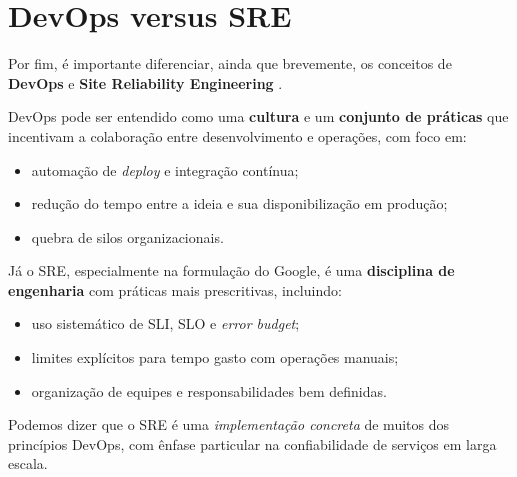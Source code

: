 \documentclass[12pt,a4paper,twoside]{report}
\begin{document}
\section{DevOps versus SRE}

Por fim, é importante diferenciar, ainda que brevemente, os conceitos de
\textbf{DevOps} \cite{kim2018devops, humble2010} e \textbf{Site Reliability Engineering} \cite{beyer2016sre}.

DevOps pode ser entendido como uma \textbf{cultura} e um \textbf{conjunto de
práticas} que incentivam a colaboração entre desenvolvimento e operações, com
foco em:
\begin{itemize}[nosep]
    \item automação de \emph{deploy} e integração contínua;
    \item redução do tempo entre a ideia e sua disponibilização em produção;
    \item quebra de silos organizacionais.
\end{itemize}

Já o SRE, especialmente na formulação do Google, é uma \textbf{disciplina de
engenharia} com práticas mais prescritivas, incluindo:
\begin{itemize}[nosep]
    \item uso sistemático de SLI, SLO e \emph{error budget};
    \item limites explícitos para tempo gasto com operações manuais;
    \item organização de equipes e responsabilidades bem definidas.
\end{itemize}

Podemos dizer que o SRE é uma \emph{implementação concreta} de muitos dos
princípios DevOps, com ênfase particular na confiabilidade de serviços em
larga escala.
\end{document}
